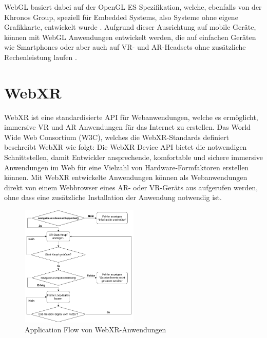 WebGL basiert dabei auf der OpenGL ES Spezifikation, welche, ebenfalls von der Khronos Group, speziell für Embedded Systems, also Systeme ohne eigene Grafikkarte, entwickelt wurde \autocite[]{khronos-opengles}.
Aufgrund dieser Ausrichtung auf mobile Geräte, können mit WebGL Anwendungen entwickelt werden, die auf einfachen Geräten wie Smartphones oder aber auch auf VR- und AR-Headsets ohne zusätzliche Rechenleistung laufen \autocite[][S.3]{Baruah2021}.




\section{WebXR}

WebXR ist eine standardisierte API für Webanwendungen, welche es ermöglicht, immersive VR und AR Anwendungen für das Internet zu erstellen.
Das World Wide Web Consortium (W3C), welches die WebXR-Standards definiert beschreibt WebXR wie folgt: \glqq{}Die WebXR Device API bietet die notwendigen Schnittstellen, damit Entwickler ansprechende, komfortable und sichere immersive Anwendungen im Web für eine Vielzahl von Hardware-Formfaktoren erstellen können.\grqq{} \autocite[aus dem Englischen mit DeepL ][1. Introduction]{w3c_webxr}
Mit WebXR entwickelte Anwendungen können als Webanwendungen direkt von einem Webbrowser eines AR- oder VR-Geräts aus aufgerufen werden, ohne dass eine zusätzliche Installation der Anwendung notwendig ist.

\begin{figure}[H]
    \centering
    \includegraphics[width=0.5\textwidth]{images/WebXR-App-Flow.png}
    \caption{Application Flow von WebXR-Anwendungen}
    \label{fig:webxr-app-flow}
  \end{figure}

